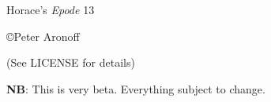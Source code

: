 \begin{titlepage}

\begin{center}

\huge Horace's \textit{Epode} 13

\vskip2in

\large \copyright Peter Aronoff \the\year

(See LICENSE for details)

\vskip1in

\textbf{NB}: This is very beta. Everything subject to change.

\vskip2in

\newpage

\end{center}

\end{titlepage}
